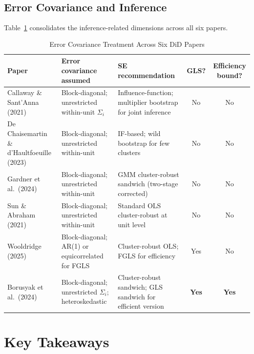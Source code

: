 \documentclass[12pt]{article}
\begin{document}
\subsection{Error Covariance and Inference}

Table~\ref{tab:summary} consolidates the inference-related dimensions across all six papers.

\begin{table}[ht]
\centering
\caption{Error Covariance Treatment Across Six DiD Papers}
\label{tab:summary}
\renewcommand{\arraystretch}{1.4}
\begin{tabularx}{\textwidth}{@{}lXXcc@{}}
\toprule
\textbf{Paper} & \textbf{Error covariance assumed} & \textbf{SE recommendation}
  & \textbf{GLS?} & \textbf{Efficiency bound?} \\
\midrule
Callaway \& Sant'Anna (2021)
  & Block-diagonal; unrestricted within-unit $\Sigma_i$
  & Influence-function; multiplier bootstrap for joint inference
  & No & No \\
De Chaisemartin \& d'Haultfoeuille (2023)
  & Block-diagonal; unrestricted within-unit
  & IF-based; wild bootstrap for few clusters
  & No & No \\
Gardner et al.\ (2024)
  & Block-diagonal; unrestricted within-unit
  & GMM cluster-robust sandwich (two-stage corrected)
  & No & No \\
Sun \& Abraham (2021)
  & Block-diagonal; unrestricted within-unit
  & Standard OLS cluster-robust at unit level
  & No & No \\
Wooldridge (2025)
  & Block-diagonal; AR(1) or equicorrelated for FGLS
  & Cluster-robust OLS; FGLS for efficiency
  & Yes & No \\
Borusyak et al.\ (2024)
  & Block-diagonal; unrestricted $\Sigma_i$; heteroskedastic
  & Cluster-robust sandwich; GLS sandwich for efficient version
  & \textbf{Yes} & \textbf{Yes} \\
\bottomrule
\end{tabularx}
\end{table}

\section{Key Takeaways}
\end{document}
